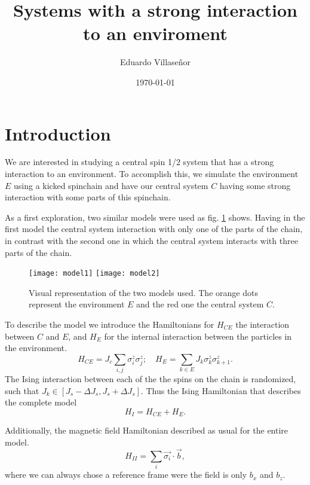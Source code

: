 \documentclass[twocolumn,floatfix]{article}
\title{Systems with a strong interaction to an enviroment}
\author{Eduardo Villase\~nor}
\date{\today}
\begin{document}
\maketitle



\section{Introduction}

We are interested in studying a central spin 1/2 system that has a strong interaction to an 
environment. To accomplish this, we simulate the environment $E$ using a kicked spinchain and have
our central system $C$ having some strong interaction with some parts of this spinchain.

As a first exploration, two similar models were used as fig. \ref{models} shows. Having in the
first model the central system interaction with only one of the parts of the chain, in contrast
with the second one in which the central system interacts with three parts of the chain.


\begin{figure}[H]
\begin{center}
\texttt{[image: model1]} \hfill
\texttt{[image: model2]} 
\end{center}
\caption{Visual representation of the two models used. The orange dots
represent the environment $E$ and the red one the central system $C$.}
\label{models}
\end{figure}

To describe the model we introduce the Hamiltonians for $H_{CE}$ the interaction between $C$ and $E$, and $H_{E}$ for the internal interaction 
between the particles in the environment.
\begin{equation}
H_{CE}=J_c\sum_{i,j} \sigma_i^z \sigma_j^z; \quad H_{E}=  \sum_{k \in E} J_{k} \sigma_{k}^z \sigma_{k+1}^z.
\end{equation}
The Ising interaction between each of the the spins on the chain is randomized,
such that $J_k \in [J_s-\Delta J_s,J_s+\Delta J_s]$.
Thus the Ising Hamiltonian that describes the complete model
\begin{equation}
H_{I}=H_{CE} + H_{E}.
\end{equation}

Additionally, the magnetic field Hamiltonian described as usual for the entire model.
\begin{equation}
H_{II}=\sum_{i} \vec{\sigma_i} \cdot \vec{b},
\end{equation}
where we can always chose a reference frame were the field is only $b_x$ and $b_z$.
\end{document}
